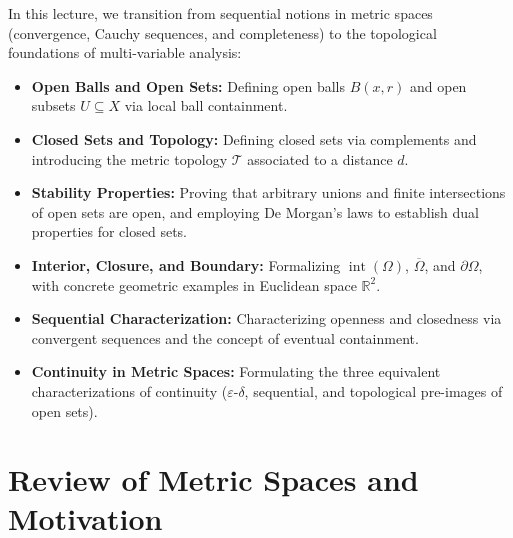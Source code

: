 \begin{overview}
In this lecture, we transition from sequential notions in metric spaces (convergence, Cauchy sequences, and completeness) to the topological foundations of multi-variable analysis:
\begin{itemize}
    \item \textbf{Open Balls and Open Sets:} Defining open balls $B(x, r)$ and open subsets $U \subseteq X$ via local ball containment.
    \item \textbf{Closed Sets and Topology:} Defining closed sets via complements and introducing the metric topology $\mathcal{T}$ associated to a distance $d$.
    \item \textbf{Stability Properties:} Proving that arbitrary unions and finite intersections of open sets are open, and employing De Morgan's laws to establish dual properties for closed sets.
    \item \textbf{Interior, Closure, and Boundary:} Formalizing $\operatorname{int}(\Omega)$, $\overline{\Omega}$, and $\partial\Omega$, with concrete geometric examples in Euclidean space $\mathbb{R}^2$.
    \item \textbf{Sequential Characterization:} Characterizing openness and closedness via convergent sequences and the concept of eventual containment.
    \item \textbf{Continuity in Metric Spaces:} Formulating the three equivalent characterizations of continuity ($\varepsilon$-$\delta$, sequential, and topological pre-images of open sets).
\end{itemize}
\end{overview}

\section{Review of Metric Spaces and Motivation}

